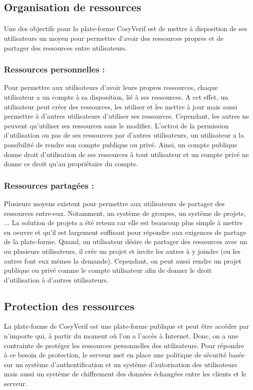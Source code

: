 \documentclass{report}
\begin{document}
\subsection{Organisation de ressources}

\paragraph{}
Une des objectifs pour la plate-forme CosyVerif est de mettre à disposition de ses utilisateurs un moyen pour permettre
d'avoir des ressources propres et de partager des ressources entre utilisateurs.

\subsubsection{Ressources personnelles :}
Pour permettre aux utilisateurs d'avoir leurs propres ressources, chaque utilisateur a un compte à sa disposition, lié à ses 
ressources. A cet effet, un utilisateur peut créer des ressources, les utiliser et les mettre à jour mais aussi permettre à 
d'autres utilisateurs d'utiliser ses ressources. Cependant, les autres ne peuvent qu'utiliser ses ressources sans le modifier.
L'octroi de la permission d'utilisation ou pas de ses ressources par d'autres utilisateurs, un utilisateur a la possibilité de 
rendre son compte publique ou privé. Ainsi, un compte publique donne droit d'utilisation de ses ressources à tout 
utilisateur et un compte privé ne donne ce droit qu'au propriétaire du compte.

\subsubsection{Ressources partagées :}
Plusieurs moyens existent pour permettre aux utilisateurs de partager des ressources entre-eux. Notamment, un système
de groupes, un système de projets, ... La solution de projets a été retenu car elle est beaucoup plus simple à mettre en 
oeuvre et qu'il est largement suffisant pour répondre aux exigences de partage de la plate-forme. Quand, un utilisateur
désire de partager des ressources avec un ou plusieurs utilisateurs, il crée un projet et invite les autres à y joindre (ou 
les autres font eux mêmes la demande). Cependant, on peut aussi rendre un projet publique ou privé comme le compte
utilisateur afin de donner le droit d'utilisation à d'autres utilisateurs.


\subsection{Protection des ressources}
La plate-forme de CosyVerif est une plate-forme publique et peut être accéder par n'importe qui, à partir du moment où
l'on a l'accès à Internet. Donc, on a une contrainte de protéger les ressources personnelles des utilisateurs. Pour répondre 
à ce besoin de protection, le serveur met en place une politique de sécurité basée sur un système d'authentification et un système d'autorisation des utilisateurs mais aussi un système de chiffrement des données échangées entre les clients et le serveur.
\end{document}
